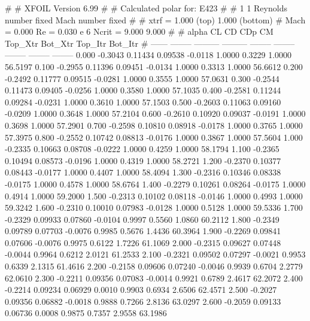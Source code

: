 #  
#       XFOIL         Version 6.99
#  
# Calculated polar for: E423                                            
#  
# 1 1 Reynolds number fixed          Mach number fixed         
#  
# xtrf =   1.000 (top)        1.000 (bottom)  
# Mach =   0.000     Re =     0.030 e 6     Ncrit =   9.000  9.000
#  
#   alpha    CL        CD       CDp       CM     Top_Xtr  Bot_Xtr  Top_Itr  Bot_Itr
#  ------ -------- --------- --------- -------- -------- -------- -------- --------
   0.000  -0.3043   0.11434   0.09538  -0.0118   1.0000   0.3229   1.0000  56.5197
   0.100  -0.2955   0.11396   0.09451  -0.0134   1.0000   0.3313   1.0000  56.6612
   0.200  -0.2492   0.11777   0.09515  -0.0281   1.0000   0.3555   1.0000  57.0631
   0.300  -0.2544   0.11473   0.09405  -0.0256   1.0000   0.3580   1.0000  57.1035
   0.400  -0.2581   0.11244   0.09284  -0.0231   1.0000   0.3610   1.0000  57.1503
   0.500  -0.2603   0.11063   0.09160  -0.0209   1.0000   0.3648   1.0000  57.2104
   0.600  -0.2610   0.10920   0.09037  -0.0191   1.0000   0.3698   1.0000  57.2901
   0.700  -0.2598   0.10810   0.08918  -0.0178   1.0000   0.3765   1.0000  57.3975
   0.800  -0.2552   0.10742   0.08813  -0.0176   1.0000   0.3867   1.0000  57.5604
   1.000  -0.2335   0.10663   0.08708  -0.0222   1.0000   0.4259   1.0000  58.1794
   1.100  -0.2365   0.10494   0.08573  -0.0196   1.0000   0.4319   1.0000  58.2721
   1.200  -0.2370   0.10377   0.08443  -0.0177   1.0000   0.4407   1.0000  58.4094
   1.300  -0.2316   0.10346   0.08338  -0.0175   1.0000   0.4578   1.0000  58.6764
   1.400  -0.2279   0.10261   0.08264  -0.0175   1.0000   0.4914   1.0000  59.2000
   1.500  -0.2313   0.10102   0.08118  -0.0146   1.0000   0.4993   1.0000  59.3242
   1.600  -0.2310   0.10010   0.07983  -0.0128   1.0000   0.5128   1.0000  59.5336
   1.700  -0.2329   0.09933   0.07860  -0.0104   0.9997   0.5560   1.0860  60.2112
   1.800  -0.2349   0.09789   0.07703  -0.0076   0.9985   0.5676   1.4436  60.3964
   1.900  -0.2269   0.09841   0.07606  -0.0076   0.9975   0.6122   1.7226  61.1069
   2.000  -0.2315   0.09627   0.07448  -0.0044   0.9964   0.6212   2.0121  61.2533
   2.100  -0.2321   0.09502   0.07297  -0.0021   0.9953   0.6339   2.1315  61.4616
   2.200  -0.2158   0.09606   0.07240  -0.0046   0.9939   0.6704   2.2779  62.0610
   2.300  -0.2211   0.09356   0.07083  -0.0014   0.9921   0.6789   2.4617  62.2072
   2.400  -0.2214   0.09234   0.06929   0.0010   0.9903   0.6934   2.6506  62.4571
   2.500  -0.2027   0.09356   0.06882  -0.0018   0.9888   0.7266   2.8136  63.0297
   2.600  -0.2059   0.09133   0.06736   0.0008   0.9875   0.7357   2.9558  63.1986
